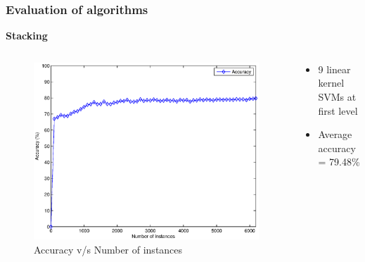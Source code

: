 \documentclass[9pt]{beamer}
\begin{document}
    \begin{frame}
        \frametitle{Evaluation of algorithms}
        \begin{center}
            \textbf{Stacking}
        \end{center}
        \begin{columns}
            \begin{column}{0.5\textwidth}
                \begin{figure}
                    \centering
                    \includegraphics[width=\textwidth]{figures/stacking_accuracy.eps}
                    \caption{Accuracy v/s Number of instances}
                \end{figure}
            \end{column}
            \begin{column}{0.5\textwidth}
                \begin{itemize}
                    \item{9 linear kernel SVMs at first level}
                    \item{Average accuracy = 79.48\%}
                \end{itemize}
            \end{column}
        \end{columns}
    \end{frame}
    
\end{document}
